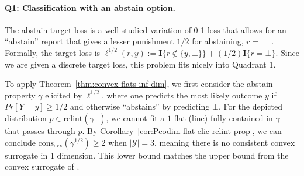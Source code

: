 \documentclass[11pt]{article} %
\newcommand{\relint}[1]{\mathrm{relint}(#1)}
\newcommand{\conscvx}{\mathrm{cons}_\mathrm{cvx}}
\newcommand{\Y}{\mathcal{Y}}
\newcommand{\Ind}[1]{\mathbf{I}\{{#1}\}}
\begin{document}
\paragraph{Q1: Classification with an abstain option.}
The abstain target loss is a well-studied variation of 0-1 loss that allows for an ``abstain'' report that gives a lesser punishment $1/2$ for abstaining, $r = \bot$~\citep{ramaswamy2018consistent,ramaswamy2016convex,madras2018predict,chow1957optimum,cortes2016learning}.
Formally, the target loss is $\ell^{1/2}(r,y) := \Ind{r \not \in \{y, \bot\}} + (1/2)\Ind{r = \bot}$.
Since we are given a discrete target loss, this problem fits nicely into Quadrant 1.

To apply Theorem~\ref{thm:convex-flats-inf-dim}, we first consider the abstain property $\gamma$ elicited by $\ell^{1/2}$, where one predicts the most likely outcome $y$ if $Pr[Y=y] \geq 1/2$ and otherwise ``abstains'' by predicting $\bot$.
For the depicted distribution $p \in \relint{\gamma_\bot}$, we cannot fit a $1$-flat (line) fully contained in $\gamma_\bot$ that passes through $p$.
By Corollary~\ref{cor:Pcodim-flat-elic-relint-prop}, we can conclude $\conscvx(\gamma^{1/2}) \geq 2$ when $|\Y|=3$, meaning there is no consistent convex surrogate in 1 dimension.
This lower bound matches the upper bound from the convex surrogate of
\citet{ramaswamy2016convex}.
\end{document}
